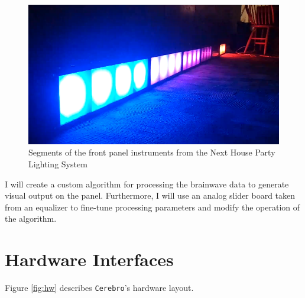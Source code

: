 \documentclass[letterpaper,10pt,notitlepage]{report}
\newcommand{\projname}{\texttt{Cerebro}}
\begin{document}
    \begin{figure}[h!]
    \begin{center}
        \includegraphics[scale=.2]{fig/photo.png}
        \caption{Segments of the front panel instruments from the Next House 
        Party Lighting System}
        \label{fig:photo}
    \end{center}
    \end{figure}

    I will create a custom algorithm for processing the brainwave data to 
    generate visual output on the panel.  Furthermore, I will use an analog 
    slider board taken from an equalizer to fine-tune processing parameters 
    and modify the operation of the algorithm.

\section{Hardware Interfaces}
    Figure \ref{fig:hw} describes \projname's hardware layout.
\end{document}
